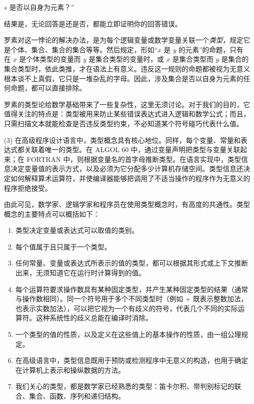 \quad $s$ 是否以自身为元素？”

\noindent
结果是，无论回答是还是否，都能立即证明你的回答错误。

罗素对这一悖论的解决办法，是为每个逻辑变量或数学变量关联一个\textit{类型}，规定它是个体、集合、集合的集合等等。然后规定，形如“$x$ 是 $y$ 的元素”的命题，只有在 $x$ 是个体类型的变量而 $y$ 是集合类型的变量时，或 $x$ 是集合类型而 $y$ 是集合的集合类型时，依此类推，才在语法上有意义。违反这一规则的命题都被视为无意义\textemdash{}根本谈不上真假，它只是一堆杂乱的字母。因此，涉及集合是否以自身为元素的任何命题，都可以直接排除。

罗素的类型论给数学基础带来了一些复杂性，这里无须讨论。对于我们的目的，它值得关注的特点是：类型被用来防止某些错误表达式进入逻辑和数学公式；而且，只需扫描文本就能检查是否违反类型约束，不必知道某个符号碰巧代表什么值。

(3) 在高级程序设计语言中，类型概念具有核心地位。同样，每个变量、常量和表达式都关联着唯一的类型。在 ALGOL 60 中，通过变量声明把类型与变量关联起来；在 FORTRAN 中，则根据变量名的首字母推断类型。在语言实现中，类型信息决定变量值的表示方式，以及必须为它分配多少计算机存储空间。类型信息还决定如何解释算术运算符，并使编译器能够把调用了不适当操作的程序作为无意义的程序拒绝接受。

由此可见，数学家、逻辑学家和程序员在使用类型概念时，有高度的共通性。类型概念的主要特点可以概括如下：

\begin{enumerate}[wide, nosep, label=(\arabic*)]
	\item 类型决定变量或表达式可以取值的类别。
	\item 每个值属于且只属于一个类型。
	\item 任何常量、变量或表达式所表示的值的类型，都可以根据其形式或上下文推断出来，无须知道它在运行时计算得到的值。
	\item 每个运算符要求操作数具有某种固定类型，并产生某种固定类型的结果（通常与操作数相同）。同一个符号用于多个不同类型时（例如 $+$ 既表示整数加法，也表示实数加法），可以把它视为一个有歧义的符号，代表几个不同的实际运算符。这种系统性的歧义总能在编译时消除。
	\item 一个类型的值的性质，以及定义在这些值上的基本操作的性质，由一组公理规定。
	\item 在高级语言中，类型信息既用于预防或检测程序中无意义的构造，也用于确定在计算机上表示和操纵数据的方法。
	\item 我们关心的类型，都是数学家已经熟悉的类型：笛卡尔积、带判别标记的联合、集合、函数、序列和递归结构。
\end{enumerate}


